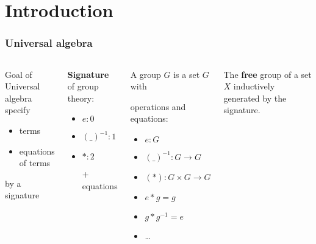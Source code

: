 \documentclass[
serif,
mathsans,
]
{beamer}
\begin{document}



\section*{Introduction}


\begin{frame}
 \frametitle{Universal algebra}
 
 \begin{columns}
  

  \begin{block}{Goal of Universal algebra}
   specify
   \begin{itemize}
    \item terms
    \item equations of terms
   \end{itemize}
   by a signature
  \end{block}

  \begin{exampleblock}{\textbf{Signature} of group theory:}
     \begin{itemize}
      \item $e : 0$
      \item $(\_)^{-1} : 1$
      \item $ * : 2$
      \item [+] equations
     \end{itemize}
  \end{exampleblock}
  
  
 
 \begin{exampleblock}{A group $G$ is a set $G$ with}
 
    operations and equations:
   \begin{itemize}
    \item $e : G$
    \item $(\_)^{-1} : G \to G$
    \item $(*) : G \times G \to G$
    \item $ e * g = g$
    \item $g * g^{-1} = e$
    \item \ldots
   \end{itemize}

  \end{exampleblock}
  
  \begin{block}{The \textbf{free} group of a set $X$} 
     inductively generated by the signature.
  \end{block}

  
 \end{columns}
 
 
\end{frame}
\end{document}
